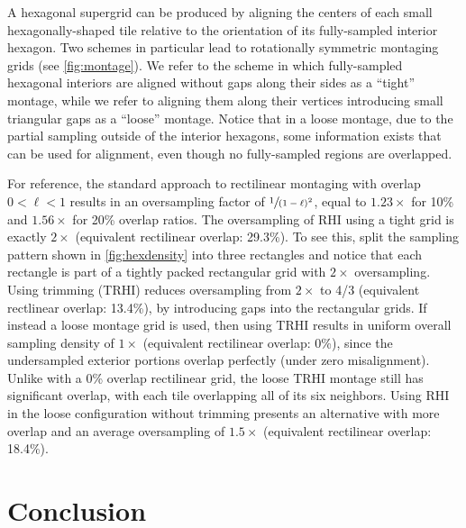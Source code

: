 \documentclass[aip, amsmath, amssymb, nobibnotes, nofootinbib, citeautoscript, reprint, superscriptaddress]{revtex4-2}
\begin{document}
    A hexagonal supergrid can be produced by aligning the centers of each small hexagonally-shaped tile relative to the orientation of its fully-sampled interior hexagon.
    Two schemes in particular lead to rotationally symmetric montaging grids (see \autoref{fig:montage}).
    We refer to the scheme in which fully-sampled hexagonal interiors are aligned without gaps along their sides as a ``tight'' montage, while we refer to aligning them along their vertices introducing small triangular gaps as a ``loose'' montage.
    Notice that in a loose montage, due to the partial sampling outside of the interior hexagons, some information exists that can be used for alignment, even though no fully-sampled regions are overlapped.


    For reference, the standard approach to rectilinear montaging with overlap $0<\ell<1$ results in an oversampling factor of $\sfrac{1}{(1-\ell)^2}$, equal to $1.23\times$ for 10\% and $1.56\times$ for 20\% overlap ratios.
    The oversampling of RHI using a tight grid is exactly $2\times$ (equivalent rectilinear overlap: 29.3\%).
    To see this, split the sampling pattern shown in \autoref{fig:hexdensity} into three rectangles and notice that each rectangle is part of a tightly packed rectangular grid with $2\times$ oversampling.
    Using trimming (TRHI) reduces oversampling from $2\times$ to 4/3 (equivalent rectlinear overlap: 13.4\%), by introducing gaps into the rectangular grids.
    If instead a loose montage grid is used, then using TRHI results in uniform overall sampling density of $1\times$ (equivalent rectilinear overlap: 0\%), since the undersampled exterior portions overlap perfectly (under zero misalignment).
    Unlike with a 0\% overlap rectilinear grid, the loose TRHI montage still has significant overlap, with each tile overlapping all of its six neighbors.
    Using RHI in the loose configuration without trimming presents an alternative with more overlap and an average oversampling of $1.5\times$ (equivalent rectilinear overlap: 18.4\%).

    \section{\label{sec:conclusion}Conclusion}
\end{document}
